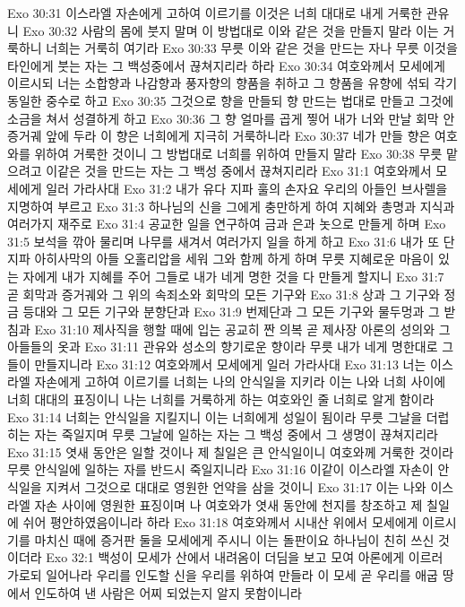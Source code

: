 Exo 30:31  이스라엘 자손에게 고하여 이르기를 이것은 너희 대대로 내게 거룩한 관유니
Exo 30:32  사람의 몸에 붓지 말며 이 방법대로 이와 같은 것을 만들지 말라 이는 거룩하니 너희는 거룩히 여기라
Exo 30:33  무릇 이와 같은 것을 만드는 자나 무릇 이것을 타인에게 붓는 자는 그 백성중에서 끊쳐지리라 하라
Exo 30:34  여호와께서 모세에게 이르시되 너는 소합향과 나감향과 풍자향의 향품을 취하고 그 향품을 유향에 섞되 각기 동일한 중수로 하고
Exo 30:35  그것으로 향을 만들되 향 만드는 법대로 만들고 그것에 소금을 쳐서 성결하게 하고
Exo 30:36  그 향 얼마를 곱게 찧어 내가 너와 만날 회막 안 증거궤 앞에 두라 이 향은 너희에게 지극히 거룩하니라
Exo 30:37  네가 만들 향은 여호와를 위하여 거룩한 것이니 그 방법대로 너희를 위하여 만들지 말라
Exo 30:38  무릇 맡으려고 이같은 것을 만드는 자는 그 백성 중에서 끊쳐지리라
Exo 31:1  여호와께서 모세에게 일러 가라사대
Exo 31:2  내가 유다 지파 훌의 손자요 우리의 아들인 브사렐을 지명하여 부르고
Exo 31:3  하나님의 신을 그에게 충만하게 하여 지혜와 총명과 지식과 여러가지 재주로
Exo 31:4  공교한 일을 연구하여 금과 은과 놋으로 만들게 하며
Exo 31:5  보석을 깎아 물리며 나무를 새겨서 여러가지 일을 하게 하고
Exo 31:6  내가 또 단 지파 아히사막의 아들 오홀리압을 세워 그와 함께 하게 하며 무릇 지혜로운 마음이 있는 자에게 내가 지혜를 주어 그들로 내가 네게 명한 것을 다 만들게 할지니
Exo 31:7  곧 회막과 증거궤와 그 위의 속죄소와 회막의 모든 기구와
Exo 31:8  상과 그 기구와 정금 등대와 그 모든 기구와 분향단과
Exo 31:9  번제단과 그 모든 기구와 물두멍과 그 받침과
Exo 31:10  제사직을 행할 때에 입는 공교히 짠 의복 곧 제사장 아론의 성의와 그 아들들의 옷과
Exo 31:11  관유와 성소의 향기로운 향이라 무릇 내가 네게 명한대로 그들이 만들지니라
Exo 31:12  여호와께서 모세에게 일러 가라사대
Exo 31:13  너는 이스라엘 자손에게 고하여 이르기를 너희는 나의 안식일을 지키라 이는 나와 너희 사이에 너희 대대의 표징이니 나는 너희를 거룩하게 하는 여호와인 줄 너희로 알게 함이라
Exo 31:14  너희는 안식일을 지킬지니 이는 너희에게 성일이 됨이라 무릇 그날을 더럽히는 자는 죽일지며 무릇 그날에 일하는 자는 그 백성 중에서 그 생명이 끊쳐지리라
Exo 31:15  엿새 동안은 일할 것이나 제 칠일은 큰 안식일이니 여호와께 거룩한 것이라 무릇 안식일에 일하는 자를 반드시 죽일지니라
Exo 31:16  이같이 이스라엘 자손이 안식일을 지켜서 그것으로 대대로 영원한 언약을 삼을 것이니
Exo 31:17  이는 나와 이스라엘 자손 사이에 영원한 표징이며 나 여호와가 엿새 동안에 천지를 창조하고 제 칠일에 쉬어 평안하였음이니라 하라
Exo 31:18  여호와께서 시내산 위에서 모세에게 이르시기를 마치신 때에 증거판 둘을 모세에게 주시니 이는 돌판이요 하나님이 친히 쓰신 것이더라
Exo 32:1  백성이 모세가 산에서 내려옴이 더딤을 보고 모여 아론에게 이르러 가로되 일어나라 우리를 인도할 신을 우리를 위하여 만들라 이 모세 곧 우리를 애굽 땅에서 인도하여 낸 사람은 어찌 되었는지 알지 못함이니라

